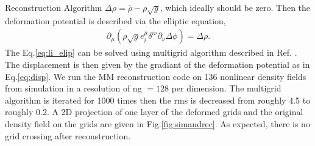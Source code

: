 \begin{section}{Reconstruction Algorithm}
$\Delta \rho = \bar{\rho}-\rho \sqrt{g}$, which ideally should be zero. Then the 
deformation potential is described via the elliptic equation,
\begin{align}
 \label{eq:li_elip}
    \partial _\mu (\rho \sqrt{g} e^\mu _i \delta^{i\nu}\partial_\nu \Delta \phi)=\Delta \rho.
\end{align}
The Eq.\ref{eq:li_elip} can be solved using multigrid algorithm described in Ref. 
\cite{bib:Pen1995,bib:Pen1998}. The displacement is then given by the gradiant of the deformation 
potential as in Eq.\ref{eq:disp}. We run the MM reconstruction code on 136 nonlinear density fields from simulation 
in a resolution of ng $=128$ per dimension. The multigrid algorithm is iterated for 1000 times then the rms 
is decreased from roughly 4.5 to roughly 0.2. 
A 2D projection of one layer of the deformed grids and the 
original density field on the grids are given in Fig.\ref{fig:simandrec}. 
As expected, there is no grid crossing after reconstruction.
%
\end{section}

